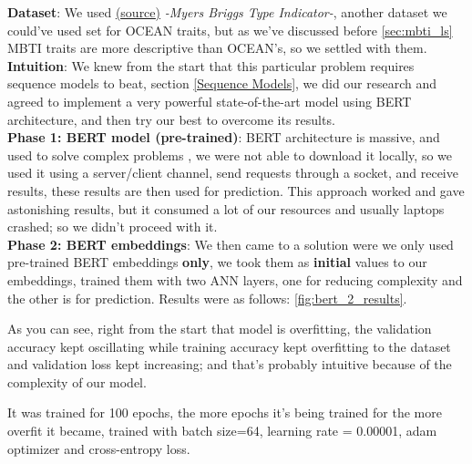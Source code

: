 \textbf{Dataset}: We used \href{https://www.kaggle.com/datasnaek/mbti-type}{(\underline{source})} \textit{-Myers Briggs Type Indicator-}, another dataset we could've used set for OCEAN traits, but as we've discussed before \ref{sec:mbti_ls} MBTI traits are more descriptive than OCEAN's, so we settled with them.\\

\textbf{Intuition}: We knew from the start that this particular problem requires sequence models to beat, section \ref{Sequence Models}, we did our research and agreed to implement a very powerful state-of-the-art model using BERT architecture, and then try our best to overcome its results.\\

\textbf{Phase 1: BERT model (pre-trained)}: BERT architecture is massive, and used to solve complex problems \cite{bert}, we were not able to download it locally, so we used it using a server/client channel, send requests through a socket, and receive results, these results are then used for prediction. This approach worked and gave astonishing results, but it consumed a lot of our resources and usually laptops crashed; so we didn't proceed with it.\\

\textbf{Phase 2: BERT embeddings}: We then came to a solution were we only used pre-trained BERT embeddings \textbf{only}, we took them as \textbf{initial} values to our embeddings, trained them with two ANN layers, one for reducing complexity and the other is for prediction. Results were as follows: \ref{fig:bert_2_results}. 

As you can see, right from the start that model is overfitting, the validation accuracy kept oscillating while training accuracy kept overfitting to the dataset and validation loss kept increasing; and that's probably intuitive because of the complexity of our model.

It was trained for 100 epochs, the more epochs it's being trained for the more overfit it became, trained with batch size=64, learning rate = 0.00001, adam optimizer and cross-entropy loss.\\

